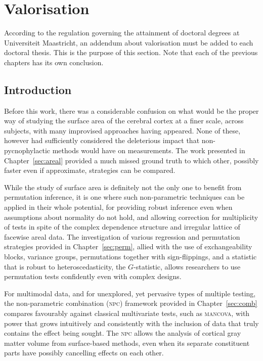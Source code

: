 \chapter{Valorisation}
\label{sec:valor}
\setstretch{\lspac}

According to the regulation governing the attainment of doctoral degrees at Uni\-versi\-teit Maas\-tricht, an addendum about valorisation must be added to each doctoral thesis. This is the purpose of this section. Note that each of the previous chapters has its own conclusion.

\section{Introduction}

Before this work, there was a considerable confusion on what would be the proper way of studying the surface area of the cerebral cortex at a finer scale, across subjects, with many improvised approaches having appeared. None of these, however had sufficiently considered the deleterious impact that non-pycnophylactic methods would have on measurements. The work presented in Chapter~\ref{sec:areal} provided a much missed ground truth to which other, possibly faster even if approximate, strategies can be compared.

While the study of surface area is definitely not the only one to benefit from permutation inference, it is one where such non-parametric techniques can be applied in their whole potential, for providing robust inference even when assumptions about normality do not hold, and allowing correction for multiplicity of tests in spite of the complex dependence structure and irregular lattice of facewise areal data. The investigation of various regression and permutation strategies provided in Chapter~\ref{sec:perm}, allied with the use of exchangeability blocks, variance groups, permutations together with sign-flippings, and a statistic that is robust to heteroscedasticity, the $G$-statistic, allows researchers to use permutation tests confidently even with complex designs.

For multimodal data, and for unexplored, yet pervasive types of multiple testing, the non-parametric combination (\textsc{npc}) framework provided in Chapter~\ref{sec:comb} compares favourably against classical multivariate tests, such as \textsc{mancova}, with power that grows intuitively and consistently with the inclusion of data that truly contains the effect being sought. The \textsc{npc} allows the analysis of cortical gray matter volume from surface-based methods, even when its separate constituent parts have possibly cancelling effects on each other.

